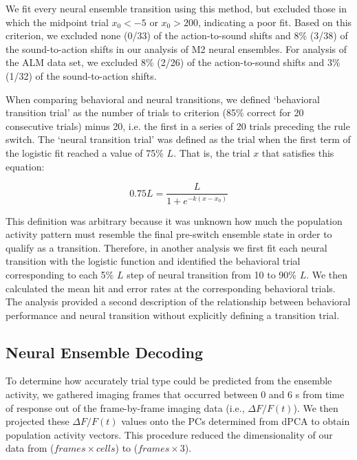 We fit every neural ensemble transition using this method, but excluded those in which the midpoint trial $x_0 < -5$ or $x_0 > 200$, indicating a poor fit. Based on this criterion, we excluded none (0/33) of the action-to-sound shifts and 8\% (3/38) of the sound-to-action shifts in our analysis of M2 neural ensembles. For analysis of the ALM data set, we excluded 8\% (2/26) of the action-to-sound shifts and 3\% (1/32) of the sound-to-action shifts. 

When comparing behavioral and neural transitions, we defined `behavioral transition trial' as the number of trials to criterion (85\% correct for 20 consecutive trials) minus 20, i.e. the first in a series of 20 trials preceding the rule switch. The `neural transition trial' was defined as the trial when the first term of the logistic fit reached a value of 75\% $L$. That is, the trial $x$ that satisfies this equation:

\begin{equation*}
0.75L = \frac{L}{1+e^{-k(x-x_0)}}
\end{equation*}

This definition was arbitrary because it was unknown how much the population activity pattern must resemble the final pre-switch ensemble state in order to qualify as a transition. Therefore, in another analysis we first fit each neural transition with the logistic function and identified the behavioral trial corresponding to each 5\% $L$ step of neural transition from 10 to 90\% $L$. We then calculated the mean hit and error rates at the corresponding behavioral trials. The analysis provided a second description of the relationship between behavioral performance and neural transition without explicitly defining a transition trial.

\subsection*{Neural Ensemble Decoding}
To determine how accurately trial type could be predicted from the ensemble activity, we gathered imaging frames that occurred between 0 and 6 s from time of response out of the frame-by-frame imaging data (i.e., $\Delta F/F (t)$). We then projected these $\Delta F/F (t)$ values onto the PCs determined from dPCA to obtain population activity vectors. This procedure reduced the dimensionality of our data from ($\mathit{frames} \times \mathit{cells}$) to ($\mathit{frames} \times 3$). 

